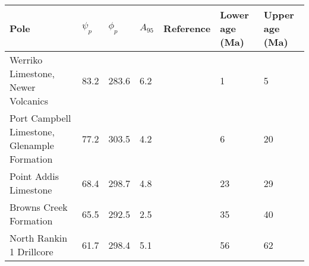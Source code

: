 \begin{tabular}{p{4cm} p{1.0cm} p{1.0cm} p{1.0cm} p{2.5cm} p{1cm} p{1cm}}
\toprule
                                         Pole &  $\psi_p$ &  $\phi_p$ &  $A_{95}$ &               Reference &  Lower age (Ma) &  Upper age (Ma) \\
\midrule
           Werriko Limestone, Newer Volcanics &      83.2 &     283.6 &       6.2 &  \cite{idnurm1985lateI} &               1 &               5 \\
 Port Campbell Limestone, Glenample Formation &      77.2 &     303.5 &       4.2 &  \cite{idnurm1985lateI} &               6 &              20 \\
                        Point Addis Limestone &      68.4 &     298.7 &       4.8 &  \cite{idnurm1985lateI} &              23 &              29 \\
                       Browns Creek Formation &      65.5 &     292.5 &       2.5 &    \cite{idnurm1994new} &              35 &              40 \\
                     North Rankin 1 Drillcore &      61.7 &     298.4 &       5.1 &  \cite{idnurm1985lateI} &              56 &              62 \\
\bottomrule
\end{tabular}
